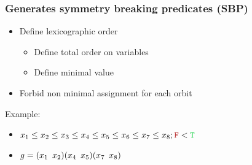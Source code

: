 \documentclass{beamer}
\newcommand{\cmark}{\ding{51}}%
\newcommand{\xmark}{\ding{55}}%
\begin{document}
\begin{frame}
	\frametitle{Generates symmetry breaking predicates (SBP)}
\begin{itemize}
	\item Define lexicographic order
	\begin{itemize}
		\item Define total order on variables
		\item Define minimal value
	\end{itemize}
	\item Forbid non minimal assignment for each orbit %
\end{itemize}

	\vfill
	Example:\\
	\begin{itemize}
		\item[]	$x_1 \leq x_2 \leq x_3  \leq x_4 \leq x_5 \leq x_6 \leq x_7 \leq x_8 ;  \false < \true$
		\item[] 	$g = (x_1 \enskip x_2)(x_4 \enskip x_5)(x_7 \enskip x_8) $\\
	\end{itemize}

	\vfill


		\begin{center}


\end{center}
\end{frame}
\end{document}
